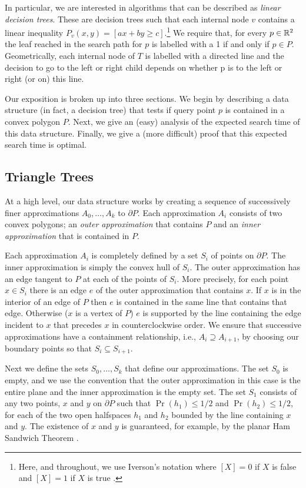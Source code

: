 \documentclass[charterfonts,lotsofwhite]{patmorin}
\newcommand{\boundary}{\partial}
\begin{document}
In particular, we are interested in algorithms that can be described
as \emph{linear decision trees}.  These are decision trees such that
each internal node $v$ contains a linear inequality $P_v(x,y)=[ax+by
\ge c]$.\footnote{Here, and throughout, we use Iverson's notation
where $[X]=0$ if $X$ is false and $[X]=1$ if $X$ is true \cite{k92}.}
We require that, for every $p\in\mathbb{R}^2$ the leaf reached in the search
path for $p$ is labelled with a 1 if and only if $p\in P$.
Geometrically, each internal node of $T$ is labelled with a directed
line and the decision to go to the left or right child depends on
whether p is to the left or right (or on) this line.  

Our exposition is broken up into three sections.  We begin by
describing a data structure (in fact, a decision tree) that tests if
query point $p$ is contained in a convex polygon  $P$.  Next, we give
an (easy) analysis of the expected search time of this data structure.
Finally, we give a (more difficult) proof that this expected search
time is optimal.


\subsection{Triangle Trees}

At a high level, our data structure works by creating a sequence of
successively finer approximations $A_0,\ldots,A_k$ to $\boundary P$.
Each approximation $A_i$ consists of two convex polygons; an
\emph{outer approximation} that contains $P$ and an \emph{inner
approximation} that is contained in $P$.

Each approximation $A_i$ is completely defined by a set $S_i$ of
points on $\boundary P$.  The inner approximation is simply the convex
hull of $S_i$.  The outer approximation has an edge tangent to $P$ at
each of the points of $S_i$.  More precisely, for each point $x\in
S_i$ there is an edge $e$ of the outer approximation that contains
$x$.  If $x$ is in the interior of an edge of $P$ then $e$ is
contained in the same line that contains that edge. Otherwise ($x$ is
a vertex of $P$) $e$ is supported by the line containing the edge
incident to $x$ that precedes $x$ in counterclockwise order.  We
ensure that successive approximations have a containment relationship,
i.e., $A_i\supseteq A_{i+1}$, by choosing our boundary points so that
$S_i\subseteq S_{i+1}$.

Next we define the sets $S_0,\ldots,S_k$ that define our
approximations.  The set $S_0$ is empty, and we use the convention
that the outer approximation in this case is the entire plane and the
inner approximation is the empty set. The set $S_1$ consists of any
two points, $x$ and $y$ on $\boundary P$ such that $\Pr(h_1)\le 1/2$
and $\Pr(h_2)\le 1/2$, for each of the two open halfspaces $h_1$ and
$h_2$ bounded by the line containing $x$ and $y$. The existence of $x$
and $y$ is guaranteed, for example, by the planar Ham Sandwich Theorem
\cite{bz04}.
\end{document}
